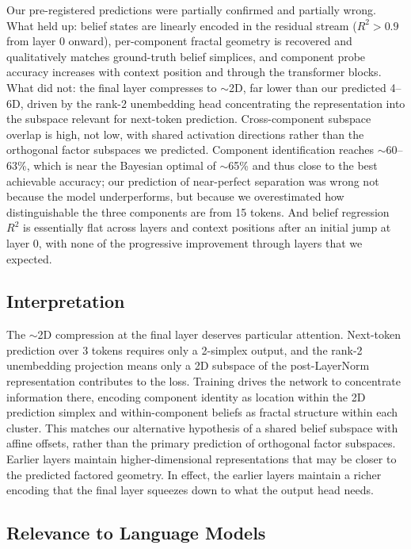 \documentclass{article}
\begin{document}
Our pre-registered predictions were partially confirmed and partially wrong. What held up: belief states are linearly encoded in the residual stream ($R^2 > 0.9$ from layer 0 onward), per-component fractal geometry is recovered and qualitatively matches ground-truth belief simplices, and component probe accuracy increases with context position and through the transformer blocks. What did not: the final layer compresses to $\sim$2D, far lower than our predicted 4--6D, driven by the rank-2 unembedding head concentrating the representation into the subspace relevant for next-token prediction. Cross-component subspace overlap is high, not low, with shared activation directions rather than the orthogonal factor subspaces we predicted. Component identification reaches $\sim$60--63\%, which is near the Bayesian optimal of $\sim$65\% and thus close to the best achievable accuracy; our prediction of near-perfect separation was wrong not because the model underperforms, but because we overestimated how distinguishable the three components are from 15 tokens. And belief regression $R^2$ is essentially flat across layers and context positions after an initial jump at layer 0, with none of the progressive improvement through layers that we expected.

\subsection{Interpretation}

The $\sim$2D compression at the final layer deserves particular attention. Next-token prediction over 3 tokens requires only a 2-simplex output, and the rank-2 unembedding projection means only a 2D subspace of the post-LayerNorm representation contributes to the loss. Training drives the network to concentrate information there, encoding component identity as location within the 2D prediction simplex and within-component beliefs as fractal structure within each cluster. This matches our alternative hypothesis of a shared belief subspace with affine offsets, rather than the primary prediction of orthogonal factor subspaces. Earlier layers maintain higher-dimensional representations that may be closer to the predicted factored geometry. In effect, the earlier layers maintain a richer encoding that the final layer squeezes down to what the output head needs.

\subsection{Relevance to Language Models}
\end{document}
